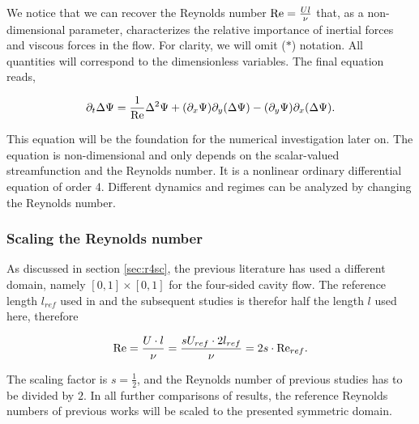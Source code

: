 We notice that we can recover the Reynolds number $\mathrm{Re} = \frac{Ul}{\nu}$ that,
as a non-dimensional parameter, characterizes the relative importance of
inertial forces and viscous forces in the flow. For clarity, we will omit ($*$)
notation. All quantities will correspond to the dimensionless variables. The
final equation reads,

\begin{align}
\partial_t \Delta \Psi = \frac{1}{\mathrm{Re}} \Delta^2 \Psi
  + (\partial_x \Psi) \partial_y(\Delta \Psi)
  - (\partial_y \Psi) \partial_x(\Delta \Psi). \label{eq:str}
\end{align}

This equation will be the foundation for the numerical investigation later on.
The equation is non-dimensional and only depends on the scalar-valued
streamfunction and the Reynolds number. It is a nonlinear ordinary differential
equation of order 4. Different dynamics and regimes can be analyzed by changing
the Reynolds number.

\subsubsection{Scaling the Reynolds number}

As discussed in section \ref{sec:r4sc}, the previous literature has used a
different domain, namely $[0,1] \times [0,1]$ for the four-sided cavity flow.
The reference length $l_{ref}$ used in \citet{wahba2009} and the subsequent
studies is therefor half the length $l$ used here, therefore

\begin{align}
\mathrm{Re} = \frac{U \cdot l}{\nu} 
  = \frac{sU_{ref} \cdot 2l_{ref}}{\nu} = 2s \cdot \mathrm{Re}_{ref}.
\end{align}

The scaling factor is $s=\frac{1}{2}$, and the Reynolds number of previous
studies has to be divided by $2$. In all further comparisons of results, the
reference Reynolds numbers of previous works will be scaled to the presented
symmetric domain.
